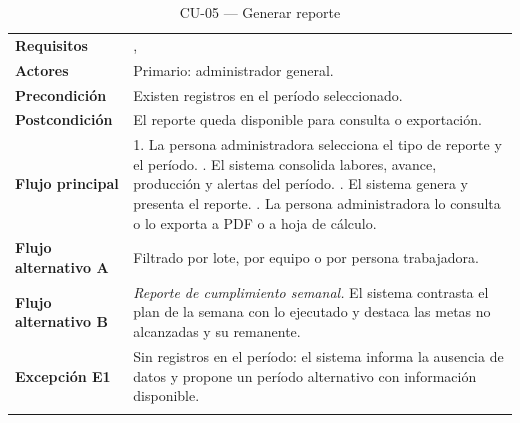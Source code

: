 \begin{longtable}{|L{3.4cm}|L{12.0cm}|}
\hline
{}\\
\hline
\textbf{Requisitos} & ,  \\ \hline
\textbf{Actores} & Primario: administrador general. \\ \hline
\textbf{Precondición} & Existen registros en el período seleccionado. \\ \hline
\textbf{Postcondición} & El reporte queda disponible para consulta o exportación. \\ \hline
\textbf{Flujo principal} & 1. La persona administradora selecciona el tipo de reporte y el período. . El sistema consolida labores, avance, producción y alertas del período. . El sistema genera y presenta el reporte. . La persona administradora lo consulta o lo exporta a PDF o a hoja de cálculo. \\ \hline
\textbf{Flujo alternativo A} & Filtrado por lote, por equipo o por persona trabajadora. \\ \hline
\textbf{Flujo alternativo B} & \emph{Reporte de cumplimiento semanal.} El sistema contrasta el plan de la semana con lo ejecutado y destaca las metas no alcanzadas y su remanente. \\ \hline
\textbf{Excepción E1} & Sin registros en el período: el sistema informa la ausencia de datos y propone un período alternativo con información disponible. \\ \hline
\caption{CU-05 --- Generar reporte}
\end{longtable}

